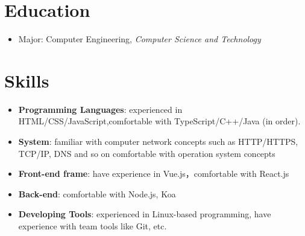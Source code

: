 \documentclass{resume}
\newcommand{\en}[1]{#1}
\newcommand{\zh}[1]{}
\begin{document}
\name{\en{Yongjia Tan}\zh{谭永佳}}

\section{\en{Education}\zh{教育经历}}
\en{}
\zh{\datedsubsection{\textbf{华南理工大学}, 本科}{2019/09 -- 至今}}
\begin{itemize}
      \item \en{Major: Computer Engineering, \textit{Computer Science and Technology}}
            \zh{计算机科学与工程 计算机科学与技术}
\end{itemize}

\section{\en{Skills}\zh{技能}}
\begin{itemize}[parsep=0.25ex]
      \item \en{\textbf{Programming Languages}:
                  experienced in HTML/CSS/JavaScript,comfortable with TypeScript/C++/Java (in order).}
            \zh{\textbf{编程语言}:
                  熟悉 HTML/CSS/JavaScript，
                  了解 TypeScript/C++/Java。}

      \item \en{\textbf{System}:
                  familiar with computer network concepts such as HTTP/HTTPS, TCP/IP, DNS and so on
                  comfortable with operation system concepts
                 }
            \zh{\textbf{系统}:
                  熟悉HTTP/HTTPS，TCP/IP，DNS等网络协议，了解操作系统的相关概念 }

      \item \en{\textbf{Front-end frame}:
                  have experience in Vue.js，comfortable with React.js}
            \zh{\textbf{前端框架}:
                  熟悉Vue.js，了解React.js }

      \item \en{\textbf{Back-end}:
                  comfortable with Node.js, Koa}
            \zh{\textbf{后端}:
                  了解Node.js，Koa}

      \item \en{\textbf{Developing Tools}:
                  experienced in Linux-based programming,
                  have experience with team tools like Git, etc.}
            \zh{\textbf{开发工具}:
                  熟悉 Linux，有Git 等团队合作工具的经验}
\end{itemize}
\end{document}
